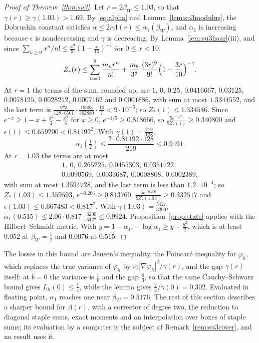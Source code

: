 \documentclass[aps,prd,twocolumn,superscriptaddress,nofootinbib,longbibliography,floatfix,amsmath,amssymb,10pt]{revtex4-2}
\theoremstyle{definition}
\theoremstyle{remark}
\begin{document}
\begin{proof}[Proof of Theorem~\ref{thm:su3}]
Let $r=2\beta_W\le1.03$, so that $\gamma(r)\ge\gamma(1.03)>1.69$. By
\eqref{eq:alpha} and Lemma~\ref{lem:su3modulus}, the Dobrushin constant
satisfies $\alpha\le2r\Lambda(r)\le\alpha_1(\beta_W)$, and $\alpha_1$ is
increasing because $\epsilon$ is nondecreasing and $\gamma$ is decreasing.
By Lemma~\ref{lem:su3haar}(iii), and since $\sum_{n\ge9}x^n/n!\le
\frac{x^9}{9!}(1-\frac x{10})^{-1}$ for $0\le x<10$,
\[
Z_*(r)\le\sum_{n=0}^8\frac{m_nr^n}{n!}+\frac{m_8}{3^8}\,
\frac{(3r)^9}{9!}\Bigl(1-\frac{3r}{10}\Bigr)^{-1}.
\]
At $r=1$ the terms of the sum, rounded up, are $1$, $0$, $0.25$,
$0.0416667$, $0.03125$, $0.0078125$, $0.0028212$, $0.0007162$ and
$0.0001886$, with sum at most $1.3344552$, and the last term is
$\frac{973}{128\cdot6561}\cdot\frac{19683}{362880}\cdot\frac{10}7<9\cdot
10^{-5}$; so $Z_*(1)\le1.334546$. Since $e^{-x}\ge1-x+\frac{x^2}2-\frac{x^3}
6$ for $x\ge0$, $e^{-1/5}\ge0.818666$, so $\frac{5e^{-1/5}}{9Z_*(1)}\ge
0.340800$ and $\epsilon(1)\le0.659200<0.81192^2$. With $\gamma(1)=
\frac{219}{128}$,
\[
\alpha_1(\tfrac12)\le\frac{2\cdot0.81192\cdot128}{219}\le0.9491 .
\]
At $r=1.03$ the terms are at most
\begin{gather*}
1,\ 0,\ 0.265225,\ 0.0455303,\ 0.0351722,\\
0.0090569,\ 0.0033687,\ 0.0008808,\ 0.0002389,
\end{gather*}
with sum at most $1.3594728$, and the last term is less than $1.2\cdot10^{-4}$;
so $Z_*(1.03)\le1.359593$, $e^{-0.206}\ge0.813760$, $\frac{5e^{-0.206}}
{9Z_*(1.03)}\ge0.332517$ and $\epsilon(1.03)\le0.667483<0.817^2$. With
$\gamma(1.03)=\frac{5427}{3200}$, $\alpha_1(0.515)\le2.06\cdot0.817\cdot
\frac{3200}{5427}\le0.9924$. Proposition~\ref{prop:state} applies with the
Hilbert--Schmidt metric. With $y=1-\alpha_1$, $-\log\alpha_1\ge y+
\frac{y^2}2$, which is at least $0.052$ at $\beta_W=\frac12$ and $0.0076$ at
$0.515$.
\end{proof}

The losses in this bound are Jensen's inequality, the Poincar\'e inequality
for $\varphi_h$, which replaces the true variance of $\varphi_h$ by
$\nu_b|\nabla\varphi_h|^2/\gamma(r)$, and the gap $\gamma(r)$ itself: at
$b=0$ the variance is $\frac16$ and the gap $\frac83$, so that the same Cauchy--Schwarz bound gives $L_h(0)\le
\frac14$, while the lemma gives $\frac23/\gamma(0)=0.302$. Evaluated in
floating point, $\alpha_1$ reaches one near $\beta_W=0.5176$. The rest of this
section describes a sharper bound for $\Lambda(r)$, with a corrector of
degree two, the reduction to diagonal staple sums, exact moments and an
interpolation over boxes of staple sums; its evaluation by a computer is
the subject of Remark~\ref{rem:su3cover}, and no result uses it.
\end{document}
